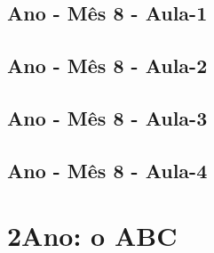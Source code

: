 \begin{multicols}{2}
\section[\sffamily 1\textordmasculine\space Ano - Mês 8 - Aula-1]{\textordmasculine\space Ano - Mês 8 - Aula-1}


\section[\sffamily 1\textordmasculine\space Ano - Mês 8 - Aula-2]{\textordmasculine\space Ano - Mês 8 - Aula-2}


\section[\sffamily 1\textordmasculine\space Ano - Mês 8 - Aula-3]{\textordmasculine\space Ano - Mês 8 - Aula-3}


\section[\sffamily 1\textordmasculine\space Ano - Mês 8 - Aula-4]{\textordmasculine\space Ano - Mês 8 - Aula-4}

\end{multicols}



	\chapter[ 2\textordmasculine\space Ano: o ABC]{2\textordmasculine\space Ano: o ABC}




\pagebreak

